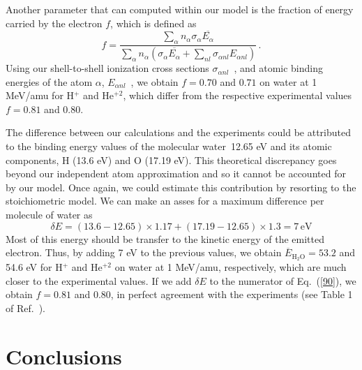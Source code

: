 \documentclass[preprint,12pt]{article}
\begin{document}
Another parameter that can computed within our model is the fraction of
energy carried by the electron $f$, which is defined as
\begin{equation}
f=\frac{\sum\limits_{\alpha}n_{\alpha}\sigma_{\alpha}
\overline{E_{\alpha}}}{\sum\limits_{\alpha}n_{\alpha}(\sigma_{\alpha}
\overline{E_{\alpha}}+\sum\limits_{nl}\sigma_{\alpha nl}E_{\alpha nl})}\,.
\label{90}
\end{equation}
Using our shell-to-shell ionization cross sections 
$\sigma_{\alpha nl}$~\cite{miraglia2019}, and atomic binding energies of 
the atom $\alpha$, $E_{\alpha nl}$~\cite{clementi}, we obtain 
$f=0.70$ and $0.71$ on water at 1 MeV/amu for H$^{+}$ and He$^{+2}$, 
which differ from the respective experimental values $f=0.81$ and $0.80$.

The difference between our calculations and the experiments could be 
attributed to the binding energy values of the molecular water~12.65 eV 
and its atomic components, H (13.6 eV) and O (17.19 eV). This theoretical
discrepancy goes beyond our independent atom approximation and so it 
cannot be accounted for by our model. Once again, we could estimate this 
contribution by resorting to the stoichiometric model. We can make an 
asses for a maximum difference per molecule of water as
\begin{equation}
\delta E=(13.6-12.65)\times1.17+(17.19-12.65)\times1.3=7\,\text{eV}  
\label{80}
\end{equation}
Most of this energy should be transfer to the kinetic energy of the 
emitted electron. Thus, by adding 7 eV to the previous values, we obtain
$\overline{E}_{\text{H}_2\text{O}}=53.2$ and 54.6 eV for H$^{+}$ and 
He$^{+2}$ on water at 1 MeV/amu, respectively, which are much closer to
the experimental values. If we add $\delta E$ to the numerator of 
Eq.~(\ref{90}), we obtain $f=0.81$ and $0.80$, in perfect agreement with 
the experiments (see Table 1 of Ref.~\cite{pimblott2007}).

\section{Conclusions}
\end{document}
